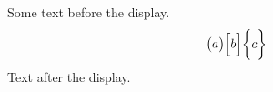\documentclass[12pt]{article}
\begin{document}
Some text before the display.
\[ \bigl( a \bigr) \Bigl[ b \Bigr] \biggl\{ c \biggr\} \]
Text after the display.
\end{document}
